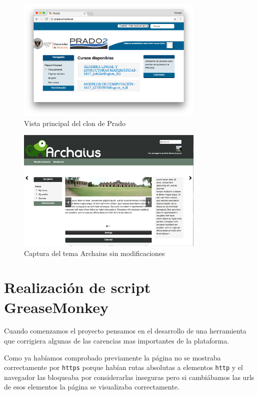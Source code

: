 \begin{figure}[H]
\centering
\includegraphics[width=0.8\textwidth]{../screenshots/pradoernesto}
\caption{Vista principal del clon de Prado}
\label{fig:pradoernesto}
\end{figure}

\begin{figure}[H]
\centering
\includegraphics[width=0.8\textwidth]{../screenshots/archaius}
\caption{Captura del tema Archaius sin modificaciones}
\label{fig:archaius}
\end{figure}




\section{Realización de script GreaseMonkey}

Cuando comenzamos el proyecto pensamos en el desarrollo de una herramienta que corrigiera algunas de las carencias mas importantes de la plataforma.

\bigskip
Como ya habíamos comprobado previamente la página no se mostraba correctamente por \texttt{https} porque habían rutas absolutas a elementos \texttt{http} y el navegador las bloqueaba por considerarlas inseguras pero si cambiábamos las urls de esos elementos la página se visualizaba correctamente.

